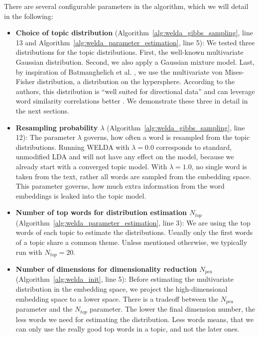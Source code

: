\documentclass[
        a4paper,
        titlepage,
        twoside,
        parskip
        ]{scrbook}
\theoremstyle{break}
\begin{document}
There are several configurable parameters in the algorithm, which we will detail in the following:
\begin{itemize}
  \item \textbf{Choice of topic distribution} (Algorithm~\ref{alg:welda_gibbs_sampling}, line 13 and Algorithm~\ref{alg:welda_parameter_estimation}, line 5):
    We tested three distributions for the topic distributions.
    First, the well-known multivariate Gaussian distribution.
    Second, we also apply a Gaussian mixture model.
    Last, by inspiration of Batmanghelich et al. \cite{Batmanghelich2016}, we use the multivariate von Mises-Fisher distribution, a distribution on the hypersphere.
    According to the authors, this distribution is ``well suited for directional data'' and can leverage word similarity correlations better \cite{Batmanghelich2016}.
    We demonstrate these three in detail in the next sections.
  \item \textbf{Resampling probability $\lambda$} (Algorithm~\ref{alg:welda_gibbs_sampling}, line 12):
    The parameter $\lambda$ governs, how often a word is resampled from the topic distributions.
    Running WELDA with $\lambda = 0.0$ corresponds to standard, unmodified LDA and will not have any effect on the model, because we already start with a converged topic model.
    With $\lambda = 1.0$, no single word is taken from the text, rather all words are sampled from the embedding space.
    This parameter governs, how much extra information from the word embeddings is leaked into the topic model.
  \item \textbf{Number of top words for distribution estimation $N_{top}$} (Algorithm~\ref{alg:welda_parameter_estimation}, line 3):
    We are using the top words of each topic to estimate the distributions.
    Usually only the first words of a topic share a common theme.
    Unless mentioned otherwise, we typically run with $N_{top} = 20$.
  \item \textbf{Number of dimensions for dimensionality reduction $N_{pca}$} (Algorithm~\ref{alg:welda_init}, line 5):
    Before estimating the multivariate distribution in the embedding space, we project the high-dimensional embedding space to a lower space.
    There is a tradeoff between the $N_{pca}$ parameter and the $N_{top}$ parameter.
    The lower the final dimension number, the less words we need for estimating the distribution.
    Less words means, that we can only use the really good top words in a topic, and not the later ones.

\end{itemize}
\end{document}
